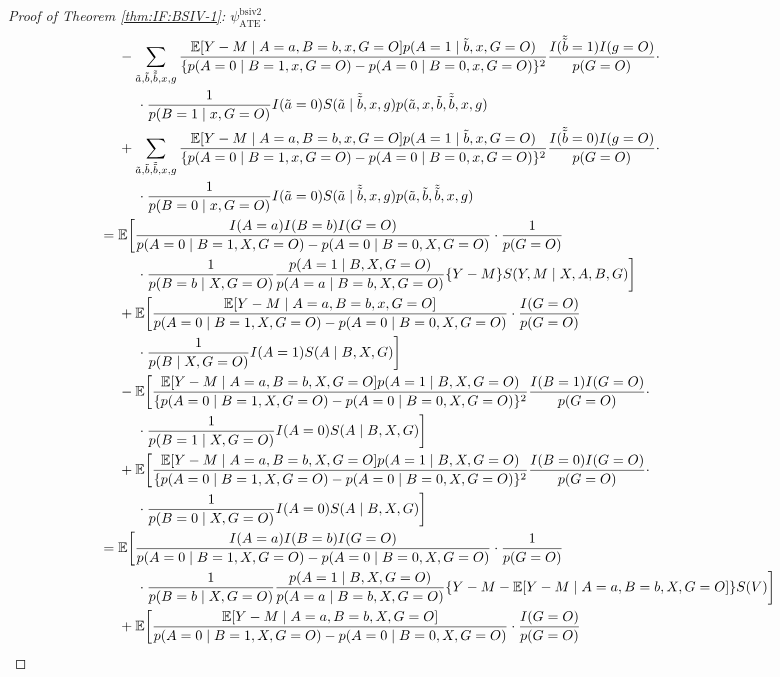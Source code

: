 \documentclass[10pt]{article}
\begin{document}
\begin{proof}[Proof of Theorem \ref{thm:IF:BSIV-1}: $\psi_{\text{ATE}}^{\text{bsiv2}}$]
{\begin{align*}
    &\ \ \ \ -\sum_{\Tilde{a},\Tilde{b},\Tilde{\Tilde{b}},x,g}\frac{\mathbb{E}[Y-M\mid A=a,B=b,x,G=O]p(A=1\mid \Tilde{b},x,G=O)}{\{p(A=0\mid B=1,x,G=O)-p(A=0\mid B=0,x,G=O)\}^2}\frac{I(\Tilde{\Tilde{b}}=1)I(g=O)}{p(G=O)}\cdot\\
    &\ \ \ \ \ \ \ \ \cdot\frac{1}{p(B=1\mid x, G=O)}I(\Tilde{a}=0)S(\Tilde{a}\mid \Tilde{\Tilde{b}},x,g)p(\Tilde{a},x,\Tilde{b},\Tilde{\Tilde{b}},x,g)\\
    &\ \ \ \ +\sum_{\Tilde{a},\Tilde{b},\Tilde{\Tilde{b}},x,g}\frac{\mathbb{E}[Y-M\mid A=a,B=b,x,G=O]p(A=1\mid \Tilde{b},x,G=O)}{\{p(A=0\mid B=1,x,G=O)-p(A=0\mid B=0,x,G=O)\}^2}\frac{I(\Tilde{\Tilde{b}}=0)I(g=O)}{p(G=O)}\cdot\\
    &\ \ \ \ \ \ \ \ \cdot\frac{1}{p(B=0\mid x, G=O)}I(\Tilde{a}=0)S(\Tilde{a}\mid \Tilde{\Tilde{b}},x,g)p(\Tilde{a},\Tilde{b},\Tilde{\Tilde{b}},x,g)\\
    &=\mathbb{E}\bigg[\frac{I(A=a)I(B=b)I(G=O)}{p(A=0\mid B=1,X,G=O)-p(A=0\mid B=0,X,G=O)}\cdot\frac{1}{p(G=O)}\\
    &\ \ \ \ \ \ \ \ \cdot\frac{1}{p(B=b\mid X,G=O)}\frac{p(A=1\mid B,X,G=O)}{p(A=a\mid B=b,X,G=O)}\{Y-M\}S(Y,M\mid X,A,B,G)\bigg]\\
    &\ \ \ \ +\mathbb{E}\bigg[\frac{\mathbb{E}[Y-M\mid A=a,B=b,x,G=O]}{p(A=0\mid B=1,X,G=O)-p(A=0\mid B=0,X,G=O)}\cdot\frac{I(G=O)}{p(G=O)}\\
    &\ \ \ \ \ \ \ \ \cdot\frac{1}{p(B\mid X,G=O)}I(A=1)S(A\mid B,X,G)\bigg]\\
    &\ \ \ \ -\mathbb{E}\bigg[\frac{\mathbb{E}[Y-M\mid A=a,B=b,X,G=O]p(A=1\mid B,X,G=O)}{\{p(A=0\mid B=1,X,G=O)-p(A=0\mid B=0,X,G=O)\}^2}\frac{I(B=1)I(G=O)}{p(G=O)}\cdot\\
    &\ \ \ \ \ \ \ \ \cdot\frac{1}{p(B=1\mid X, G=O)}I(A=0)S(A\mid B,X,G)\bigg]\\
    &\ \ \ \ +\mathbb{E}\bigg[\frac{\mathbb{E}[Y-M\mid A=a,B=b,X,G=O]p(A=1\mid B,X,G=O)}{\{p(A=0\mid B=1,X,G=O)-p(A=0\mid B=0,X,G=O)\}^2}\frac{I(B=0)I(G=O)}{p(G=O)}\cdot\\
    &\ \ \ \ \ \ \ \ \cdot\frac{1}{p(B=0\mid X, G=O)}I(A=0)S(A\mid B,X,G)\bigg]\\
    &=\mathbb{E}\bigg[\frac{I(A=a)I(B=b)I(G=O)}{p(A=0\mid B=1,X,G=O)-p(A=0\mid B=0,X,G=O)}\cdot\frac{1}{p(G=O)}\\
    &\ \ \ \ \ \ \ \ \cdot\frac{1}{p(B=b\mid X,G=O)}\frac{p(A=1\mid B,X,G=O)}{p(A=a\mid B=b,X,G=O)}\{Y-M-\mathbb{E}[Y-M\mid A=a,B=b,X,G=O]\}S(V)\bigg]\\
    &\ \ \ \ +\mathbb{E}\bigg[\frac{\mathbb{E}[Y-M\mid A=a,B=b,X,G=O]}{p(A=0\mid B=1,X,G=O)-p(A=0\mid B=0,X,G=O)}\cdot\frac{I(G=O)}{p(G=O)}\\

\end{align*}}
\end{proof}
\end{document}
